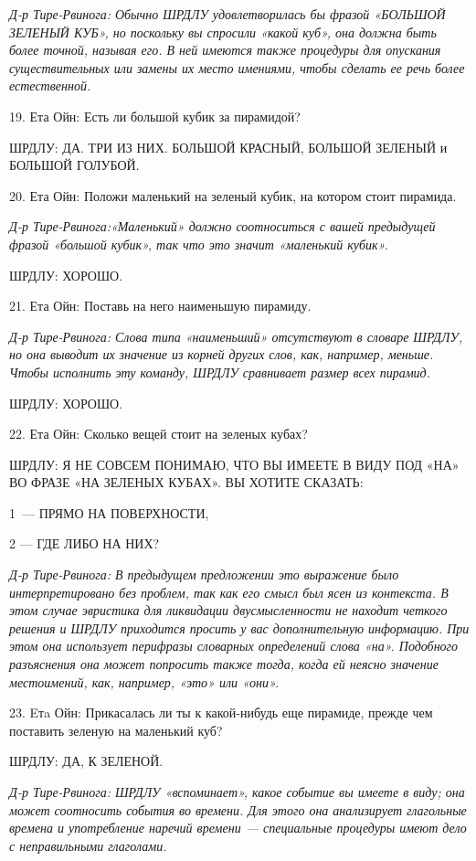 \documentclass[../main.tex]{subfiles}
\begin{document}
\begin{dialogue}
\emph{Д-р Тире-Рвинога: Обычно ШРДЛУ удовлетворилась бы фразой «БОЛЬШОЙ ЗЕЛЕНЫЙ КУБ», но поскольку вы спросили «какой куб», она должна быть более точной, называя его. В ней имеются также процедуры для опускания существительных или замены их место имениями, чтобы сделать ее речь более естественной.}

19. Ета Ойн: Есть ли большой кубик за пирамидой?

ШРДЛУ: ДА. ТРИ ИЗ НИХ. БОЛЬШОЙ КРАСНЫЙ, БОЛЬШОЙ ЗЕЛЕНЫЙ и БОЛЬШОЙ ГОЛУБОЙ.

20. Ета Ойн: Положи маленький на зеленый кубик, на котором стоит пирамида.

\emph{Д-р Тире-Рвинога:«Маленький» должно соотноситься с вашей предыдущей фразой «большой кубик», так что это значит «маленький кубик».}

ШРДЛУ: ХОРОШО.

21. Ета Ойн: Поставь на него наименьшую пирамиду.

\emph{Д-р Тире-Рвинога: Слова типа «наименьший» отсутствуют в словаре ШРДЛУ, но она выводит их значение из корней других слов, как, например, меньше. Чтобы исполнить эту команду, ШРДЛУ сравнивает размер всех пирамид.}

ШРДЛУ: ХОРОШО.

22. Ета Ойн: Сколько вещей стоит на зеленых кубах?

ШРДЛУ: Я НЕ СОВСЕМ ПОНИМАЮ, ЧТО ВЫ ИМЕЕТЕ В ВИДУ ПОД «НА» ВО ФРАЗЕ «НА ЗЕЛЕНЫХ КУБАХ». ВЫ ХОТИТЕ СКАЗАТЬ:

1~--- ПРЯМО НА ПОВЕРХНОСТИ,

2 --- ГДЕ ЛИБО НА НИХ?

\emph{Д-р Тире-Рвинога: В предыдущем предложении это выражение было интерпретировано без проблем, так как его смысл был ясен из контекста. В этом случае эвристика для ликвидации двусмысленности не находит четкого решения и ШРДЛУ приходится просить у вас дополнительную информацию. При этом она использует перифразы словарных определений слова «на». Подобного разъяснения она может попросить также тогда, когда ей неясно значение местоимений, как, например, «это» или «они».}

23. Eтa Ойн: Прикасалась ли ты к какой-нибудь еще пирамиде, прежде чем поставить зеленую на маленький куб?

ШРДЛУ: ДА, К ЗЕЛЕНОЙ.

\emph{Д-р Тире-Рвинога: ШРДЛУ «вспоминает», какое событие вы имеете в виду; она может соотносить события во времени. Для этого она анализирует глагольные времена и употребление наречий времени --- специальные процедуры имеют дело с неправильными глаголами.}


\end{dialogue}
\end{document}
